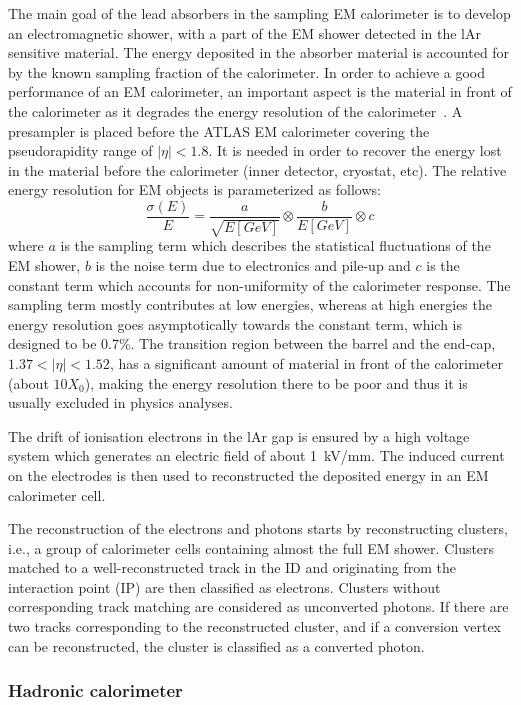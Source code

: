 The main goal of the lead absorbers in the sampling EM calorimeter is to develop an electromagnetic shower, with a part of the EM shower detected in the lAr sensitive material. The energy deposited in the absorber material is accounted for by the known sampling fraction of the calorimeter. In order to achieve a good performance of an EM calorimeter, an important aspect is the material in front of the calorimeter as it degrades the energy resolution of the calorimeter~\cite{electron_tight}.
A presampler is placed before the ATLAS EM calorimeter covering the pseudorapidity range of $|\eta|<1.8$. It is needed in order to recover the energy lost in the material before the calorimeter (inner detector, cryostat, etc).
The relative energy resolution for EM objects is parameterized as follows:
\begin{equation}
\frac{\sigma(E)}{E}=\frac{a}{\sqrt{E[GeV]}}\otimes\frac{b}{E[GeV]}\otimes c
\end{equation}
where $a$ is the sampling term which describes the statistical fluctuations of the EM shower, $b$ is the noise term due to electronics and pile-up and $c$ is the constant term which accounts for non-uniformity of the calorimeter response. The sampling term mostly contributes at low energies, whereas at high energies the energy resolution goes asymptotically towards the constant term, which is designed to be 0.7\%.
The transition region between the barrel and the end-cap, $1.37<|\eta|<1.52$, has a significant amount of material in front of the calorimeter (about $ 10 X_0$), making the energy resolution there to be poor and thus it is usually excluded in physics analyses.

The drift of ionisation electrons in the lAr gap is ensured by a high voltage system which generates an electric field of about 1~kV/mm. The induced current on the electrodes is then used to reconstructed the deposited energy in an EM calorimeter cell.

The reconstruction of the electrons and photons starts by reconstructing clusters, i.e., a group of calorimeter cells containing almost the full EM shower. Clusters matched to a well-reconstructed track in the ID and originating from the interaction point (IP) are then classified as electrons. Clusters without corresponding track matching are considered as unconverted photons. If there are two tracks corresponding to the reconstructed cluster, and if a conversion vertex can be reconstructed, the cluster is classified as a converted photon.

\subsubsection{Hadronic calorimeter}

